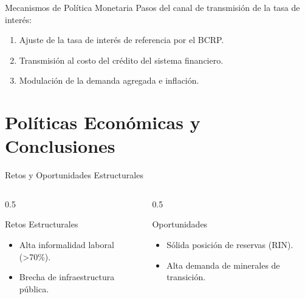 \documentclass[10pt]{beamer}
\begin{document}
\begin{frame}[label=slide_monetaria]{Mecanismos de Política Monetaria}
  Pasos del canal de transmisión de la tasa de interés:

  \begin{enumerate}[<+->]
    \item Ajuste de la tasa de interés de referencia por el BCRP.
    \item Transmisión al costo del crédito del sistema financiero.
    \item Modulación de la demanda agregada e inflación.
  \end{enumerate}

  \vspace{0.6cm}
  
  \centering
  \hyperlink{slide_apendice}{}
\end{frame}

\section{Políticas Económicas y Conclusiones}

\begin{frame}{Retos y Oportunidades Estructurales}
  \begin{columns}
    \begin{column}{0.5\textwidth}
      \begin{block}{Retos Estructurales}
        \begin{itemize}
          \item Alta informalidad laboral (>70\%).
          \item Brecha de infraestructura pública.
        \end{itemize}
      \end{block}
    \end{column}
    \begin{column}{0.5\textwidth}
      \begin{block}{Oportunidades}
        \begin{itemize}
          \item Sólida posición de reservas (RIN).
          \item Alta demanda de minerales de transición.
        \end{itemize}
      \end{block}
    \end{column}
  \end{columns}
\end{frame}
\end{document}
